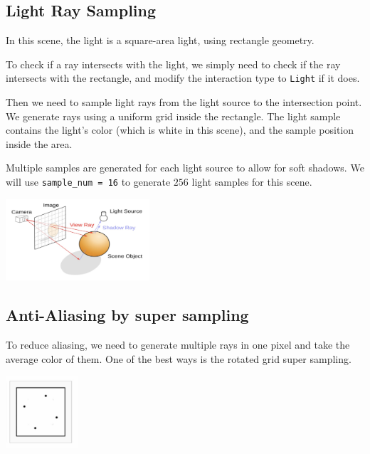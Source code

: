 \documentclass[acmtog]{acmart}
\begin{document}
\subsection{Light Ray Sampling}



In this scene, the light is a square-area light, using rectangle geometry. 

To check if a ray intersects with the light, we simply need to check if the ray intersects with the rectangle, and modify the interaction type to \verb|Light| if it does.

Then we need to sample light rays from the light source to the intersection point. We generate rays using a uniform grid inside the rectangle. The light sample contains the light's color (which is white in this scene), and the sample position inside the area. 

Multiple samples are generated for each light source to allow for soft shadows. We will use \verb|sample_num = 16| to generate $256$ light samples for this scene. 

\begin{center}
	\includegraphics[width=0.4\textwidth]{pictures/phong.jpg}
\end{center}

\subsection{Anti-Aliasing by super sampling}

To reduce aliasing, we need to generate multiple rays in one pixel and take the average color of them. One of the best ways is the rotated grid super sampling. 

\begin{center}
	\includegraphics[width=0.2\textwidth]{pictures/rotated-grid.jpg}
\end{center}
\end{document}
